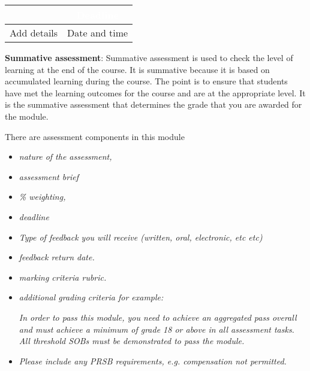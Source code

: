 \documentclass{MDXHandbook}
\begin{document}
\begin{center}
	\begin{tabular}{|p{}|p{}|}
		\rowcolor{MDXCorporateRed}\hline
		\multicolumn{1}{|c|}{\textcolor{white}{Formative assessment}} & \multicolumn{1}{|c|}{\textcolor{white}{Deadline}}\\
		\hline
		Add details & Date and time\\
		\hline
	\end{tabular}
\end{center}

\textbf{Summative assessment}: Summative assessment is used to check the level of learning at the end of the course. It is summative because it is based on accumulated learning during the course. The point is to ensure that students have met the learning outcomes for the course and are at the appropriate level. It is the summative assessment that determines the grade that you are awarded for the module.

There are  assessment components in this module 


\begin{itemize}
	\item \emph{nature of the assessment,}
	\item \emph{assessment brief}
	\item \emph{\% weighting, }
	\item \emph{deadline} 
	\item \emph{Type of feedback you will receive (written, oral, electronic, etc etc)}
	\item \emph{feedback return date. }
	\item \emph{marking criteria rubric. }
	\item \emph{additional grading criteria for example:}
	
	\emph{In order to pass this module, you need to achieve an aggregated pass overall and must achieve a minimum of grade 18 or above in all assessment tasks. 
	All threshold SOBs must be demonstrated to pass the module.}

	\item \emph{Please include any PRSB requirements, e.g. compensation not permitted. }
\end{itemize}
\end{document}
